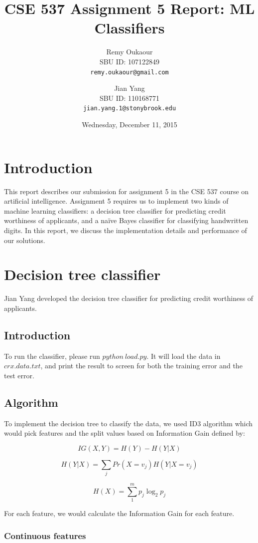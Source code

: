 \documentclass[11pt]{article}
\title{CSE 537 Assignment 5 Report: ML Classifiers}
\author{
Remy Oukaour \\
	{\small SBU ID: 107122849}\\
	{\small \texttt{remy.oukaour@gmail.com}}
\and
Jian Yang \\
	{\small SBU ID: 110168771}\\
	{\small \texttt{jian.yang.1@stonybrook.edu}}
}
\date{Wednesday, December 11, 2015}
\begin{document}
\maketitle

\section{Introduction}

This report describes our submission for assignment 5 in the CSE 537 course on
artificial intelligence. Assignment 5 requires us to implement two kinds of
machine learning classifiers: a decision tree classifier for predicting credit
worthiness of applicants, and a na{\"i}ve Bayes classifier for classifying
handwritten digits. In this report, we discuss the implementation details and
performance of our solutions.

\section{Decision tree classifier}

Jian Yang developed the decision tree classifier for predicting credit worthiness
of applicants.

\subsection{Introduction}

To run the classifier, please run $python\ load.py$. It will load the data in $crx.data.txt$,
and print the result to screen for both the training error and the test error.

\subsection{Algorithm}

To implement the decision tree to classify the data, we used  ID3 algorithm which would pick features
and the split values based on Information Gain defined by:

$$IG(X,Y) = H(Y) - H(Y|X)$$

$$H(Y|X) = \sum_jPr(X=v_j)H(Y|X=v_j)$$

$$H(X) = \sum_{1}^m p_j \log_2{p_j} $$

For each feature, we would calculate the Information Gain for each feature.

\subsubsection{Continuous features}
\end{document}
